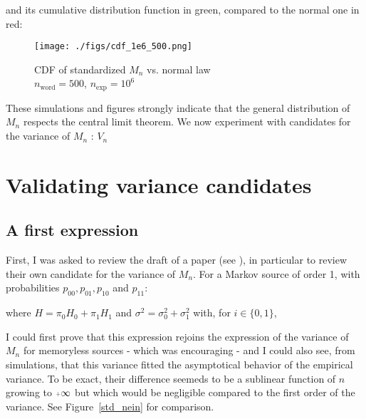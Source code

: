 	\noindent
	 and its cumulative distribution function in green, compared to the normal one in red:
 	
	  \begin{figure}[H]
		\centering
        \texttt{[image: ./figs/cdf\_1e6\_500.png]}
		\caption{CDF of standardized $M_n$ vs. normal law\\
				$n_{\text{word}} = 500$, $n_{\text{exp}} = 10^6$}
	  \end{figure} 
	
	
	These simulations and figures strongly indicate that the general distribution
	of $M_n$ respects the central limit theorem. We now experiment with
	candidates for the variance of $M_n$ : $V_n$


	
	
	\section{Validating variance candidates}
	\subsection{A first expression}

	First, I was asked to review the draft of a paper (see \cite{leckey_probabilistic_2018}),
	in particular to review their own candidate for the variance of $M_n$. 
	For a Markov source of order 1, with probabilities 
	$p_{0 0}, p_{0 1}, p_{1 0}$ and $p_{1 1}$:

		
	\noindent
	where $H = \pi_0 H_0 + \pi_1 H_1 $ and $\sigma^2 = \sigma_0^2 + \sigma_1^2$ with, for $i\in\{0,1\}$,
	
	I could first prove that this expression rejoins the expression of 
	the variance of $M_n$ for memoryless sources - which was encouraging -
	and I could also see, from simulations, that this variance fitted the 
	asymptotical behavior of the empirical variance. To be exact, 
	their difference seemeds to be a sublinear function of $n$ growing
	to $\pinf$ but which would be negligible compared to the first 
	order of the variance. See Figure~\ref{std_nein} for comparison.
	

